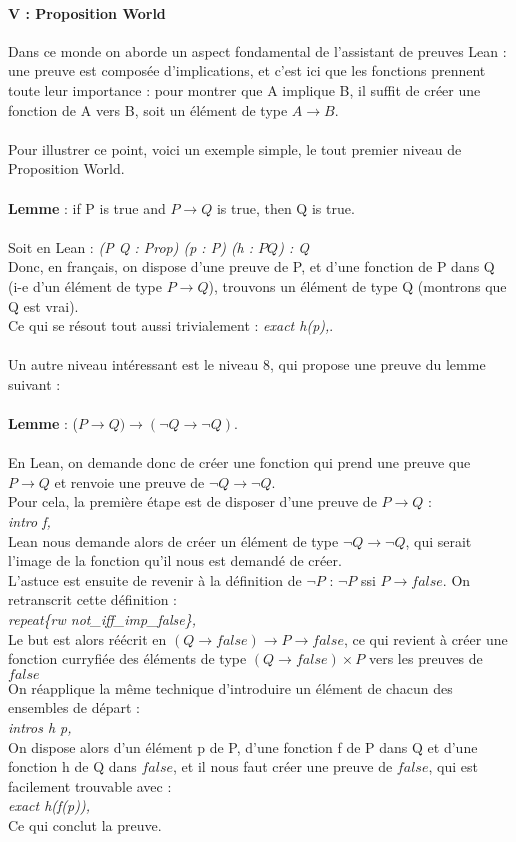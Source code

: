 \documentclass[french,frenchkw]{article}
\begin{document}
\paragraph{V : Proposition World} 
Dans ce monde on aborde un aspect fondamental de l'assistant de preuves Lean : une preuve est composée d'implications, et c'est ici que les fonctions prennent toute leur importance : pour montrer que A implique B, il suffit de créer une fonction de A vers B, soit un élément de type $A \to B$.\\
\\
Pour illustrer ce point, voici un exemple simple, le tout premier niveau de Proposition World. \\ \\
\textbf{Lemme} : if P is true and $P \to Q$ is true, then Q is true. \\ \\
Soit en Lean : \textit{(P Q : Prop) (p : P) (h : $P  Q$) : Q} \\
Donc, en français, on dispose d'une preuve de P, et d'une fonction de P dans Q (i-e d'un élément de type $P \to Q$), trouvons un élément de type Q (montrons que Q est vrai). \\
Ce qui se résout tout aussi trivialement : \textit{exact h(p),}.\\
\\
Un autre niveau intéressant est le niveau 8, qui propose une preuve du lemme suivant : \\
\\
\textbf{Lemme} : ($P \to Q) \to (\lnot Q \to \lnot Q)$. \\
\\
En Lean, on demande donc de créer une fonction qui prend une preuve que $P \to Q$ et renvoie une preuve de $\lnot Q \to \lnot Q$.
\\
Pour cela, la première étape est de disposer d'une preuve de $P \to Q$ :\\
\textit{intro f,}\\
Lean nous demande alors de créer un élément de type $\lnot Q \to \lnot Q$, qui serait l'image de la fonction qu'il nous est demandé de créer.\\
L'astuce est ensuite de revenir à la définition de $\lnot P$ : $\lnot P$ ssi $P \to false$. On retranscrit cette définition : \\
\textit{repeat\{rw not\_iff\_imp\_false\},} \\
Le but est alors réécrit en $(Q \to false) \to P \to false$, ce qui revient à créer une fonction curryfiée des éléments de type $(Q \to false) \times P$ vers les preuves de $false$\\
On réapplique la même technique d'introduire un élément de chacun des ensembles de départ : \\
\textit{intros h p,}\\
On dispose alors d'un élément p de P, d'une fonction f de P dans Q et d'une fonction h de Q dans $false$, et il nous faut créer une preuve de $false$, qui est facilement trouvable avec : \\
\textit{exact h(f(p)),}\\
Ce qui conclut la preuve.
\end{document}
